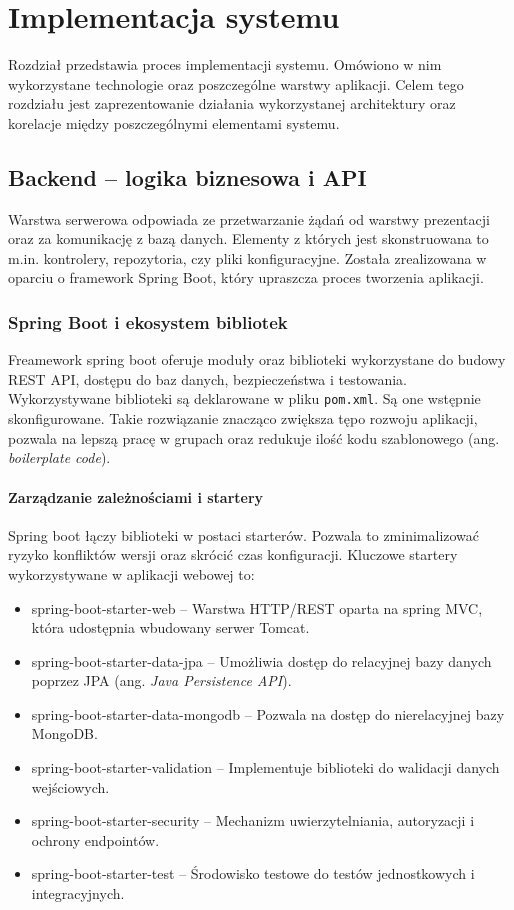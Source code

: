 \chapter{Implementacja systemu}
Rozdział  przedstawia proces implementacji systemu. Omówiono w nim wykorzystane technologie oraz poszczególne warstwy aplikacji. Celem tego rozdziału jest zaprezentowanie działania wykorzystanej architektury oraz korelacje między poszczególnymi elementami systemu.
\section{Backend – logika biznesowa i API}
Warstwa serwerowa odpowiada ze przetwarzanie żądań od warstwy prezentacji oraz za komunikację z bazą danych. Elementy z których jest skonstruowana to m.in. kontrolery, repozytoria, czy pliki konfiguracyjne. Została zrealizowana w oparciu o framework Spring Boot, który upraszcza proces tworzenia aplikacji.

\subsection*{Spring Boot i ekosystem bibliotek}
Freamework spring boot oferuje moduły oraz biblioteki wykorzystane do budowy REST API, dostępu do baz danych, bezpieczeństwa i testowania. Wykorzystywane biblioteki są deklarowane w pliku \texttt{pom.xml}. Są one wstępnie skonfigurowane. Takie rozwiązanie znacząco zwiększa tępo rozwoju aplikacji, pozwala na lepszą pracę w grupach oraz redukuje ilość kodu szablonowego (ang. \textit{boilerplate code}).
\subsubsection*{Zarządzanie zależnościami i startery}
Spring boot łączy biblioteki w postaci starterów. Pozwala to zminimalizować ryzyko konfliktów wersji oraz skrócić czas konfiguracji. Kluczowe startery wykorzystywane w aplikacji webowej to:
\begin{itemize}
	\item spring-boot-starter-web -- Warstwa HTTP/REST oparta na spring MVC, która udostępnia wbudowany serwer Tomcat. 
	\item spring-boot-starter-data-jpa -- Umożliwia dostęp do relacyjnej bazy danych poprzez JPA (ang. \textit{Java Persistence API}).
	\item spring-boot-starter-data-mongodb -- Pozwala na dostęp do nierelacyjnej bazy MongoDB. 
	\item spring-boot-starter-validation -- Implementuje biblioteki do walidacji danych wejściowych.
	\item spring-boot-starter-security -- Mechanizm uwierzytelniania, autoryzacji i ochrony endpointów.
	\item spring-boot-starter-test -- Środowisko testowe do testów jednostkowych i integracyjnych. 
\end{itemize}
